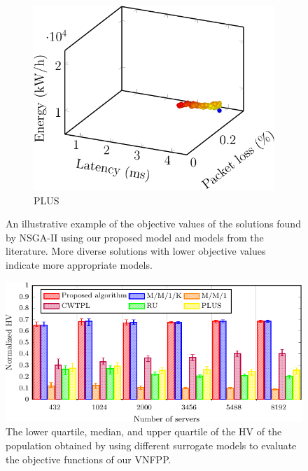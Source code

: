 \begin{figure}[t!]
\begin{subfigure}[b]{0.32\linewidth}
        \includegraphics[width=\textwidth]{graphs/model/length_used-crop}
        \caption{PLUS}
    \end{subfigure}

    \vspace{1em}
    \caption{An illustrative example of the objective values of the solutions found by NSGA-II using our proposed model and models from the literature. More diverse solutions with lower objective values indicate more appropriate models.}
    \label{fig:model_objectives}
\end{figure}

\begin{figure}[t!]
    \centering
    \includegraphics[width=\columnwidth]{graphs/model/models-crop}
    \caption{The lower quartile, median, and upper quartile of the HV of the population obtained by using different surrogate models to evaluate the objective functions of our VNFPP.}
    \label{fig:model_benefits}
\end{figure}

